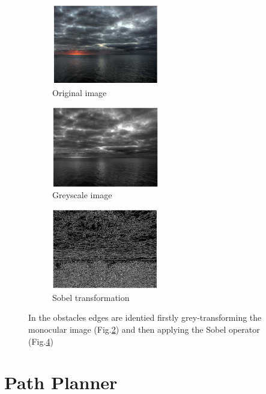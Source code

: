 \documentclass[12pt]{article}
\begin{document}
      \begin{figure}
            \centering

            \begin{subfigure}[b]{.30\linewidth}
            \includegraphics[width=\linewidth, height= 3.5cm]{./Images/Azzabi/original}
            \caption{Original image}\label{fig:original}
            \end{subfigure}
            \begin{subfigure}[b]{.30\linewidth}
            \includegraphics[width=\linewidth, height= 3.5cm]{./Images/Azzabi/greyscale}
            \caption{Greyscale image}\label{fig:greyscale}
            \end{subfigure}
            \begin{subfigure}[b]{.30\linewidth}
            \includegraphics[width=\linewidth, height= 3.5cm]{./Images/Azzabi/sobel}
            \caption{Sobel transformation}\label{fig:sobel}
            \end{subfigure}

            \caption{In \parencite{Azzabi} the obstacles edges are identied firstly grey-transforming the monocular image (Fig.\ref{fig:greyscale}) and then applying the Sobel operator (Fig.\ref{fig:sobel})}
      \end{figure}

\section{Path Planner} \label{path_planner}
\end{document}
